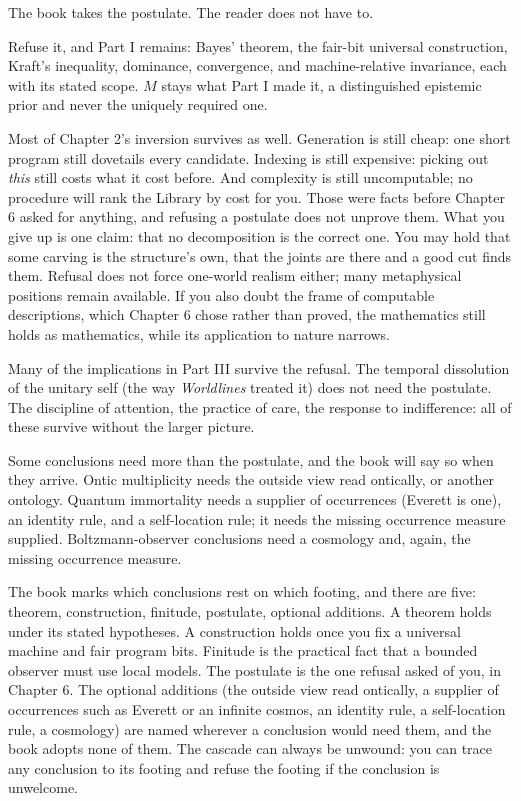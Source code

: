 The book takes the postulate. The reader does not have to.

Refuse it, and Part I remains: Bayes' theorem, the fair-bit universal construction, Kraft's inequality, dominance, convergence, and machine-relative invariance, each with its stated scope. $M$ stays what Part I made it, a distinguished epistemic prior and never the uniquely required one.

Most of Chapter 2's inversion survives as well. Generation is still cheap: one short program still dovetails every candidate. Indexing is still expensive: picking out \emph{this} still costs what it cost before. And complexity is still uncomputable; no procedure will rank the Library by cost for you. Those were facts before Chapter 6 asked for anything, and refusing a postulate does not unprove them. What you give up is one claim: that no decomposition is the correct one. You may hold that some carving is the structure's own, that the joints are there and a good cut finds them. Refusal does not force one-world realism either; many metaphysical positions remain available. If you also doubt the frame of computable descriptions, which Chapter 6 chose rather than proved, the mathematics still holds as mathematics, while its application to nature narrows.

Many of the implications in Part III survive the refusal. The temporal dissolution of the unitary self (the way \textit{Worldlines} treated it) does not need the postulate. The discipline of attention, the practice of care, the response to indifference: all of these survive without the larger picture.

Some conclusions need more than the postulate, and the book will say so when they arrive. Ontic multiplicity needs the outside view read ontically, or another ontology. Quantum immortality needs a supplier of occurrences (Everett is one), an identity rule, and a self-location rule; it needs the missing occurrence measure supplied. Boltzmann-observer conclusions need a cosmology and, again, the missing occurrence measure.

The book marks which conclusions rest on which footing, and there are five: theorem, construction, finitude, postulate, optional additions. A theorem holds under its stated hypotheses. A construction holds once you fix a universal machine and fair program bits. Finitude is the practical fact that a bounded observer must use local models. The postulate is the one refusal asked of you, in Chapter 6. The optional additions (the outside view read ontically, a supplier of occurrences such as Everett or an infinite cosmos, an identity rule, a self-location rule, a cosmology) are named wherever a conclusion would need them, and the book adopts none of them. The cascade can always be unwound: you can trace any conclusion to its footing and refuse the footing if the conclusion is unwelcome.

